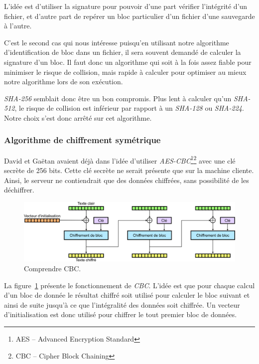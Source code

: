 \documentclass[a4paper,10pt, twoside]{report}
\begin{document}
\begin{spacing}{1.2}
L'idée est d'utiliser la signature pour pouvoir d'une part vérifier
l'intégrité d'un fichier, et d'autre part de repérer un bloc particulier d'un
fichier d'une sauvegarde à l'autre.

C'est le second cas qui nous intéresse puisqu'en utilisant notre
algorithme d'identification de bloc dans un fichier, il sera souvent demandé
de calculer la signature d'un bloc. Il faut donc un algorithme qui soit à la
fois assez fiable pour minimiser le risque de collision, mais rapide à
calculer pour optimiser au mieux notre algorithme lors de son exécution.

\textit{SHA-256}\cite{refSHA256} semblait donc être un bon compromis. Plus
lent à calculer qu'un \textit{SHA-512}, le risque de collision est
inférieur par rapport à un \textit{SHA-128} ou \textit{SHA-224}. Notre
choix s'est donc arrêté sur cet algorithme.

\subsubsection{Algorithme de chiffrement symétrique}

David et Gaëtan avaient déjà dans l'idée d'utiliser
\textit{AES-CBC}\footnote{AES -- Advanced Encryption Standard}\footnote{CBC --
Cipher Block Chaining}\cite{refAES}\cite{refCBC} avec une clé secrète de
256 bits. Cette clé secrète ne serait présente que sur la machine cliente.
Ainsi, le serveur ne contiendrait que des données chiffrées, sans
possibilité de les déchiffrer.

\begin{figure}[h!]
  \centering
  \includegraphics[width=15cm]{softwareDesign/schemaCBC.png}
  \caption{\label{schemaCBC} Comprendre CBC.}
\end{figure}

La figure~\ref{schemaCBC} présente le fonctionnement de \textit{CBC}. L'idée
est que pour chaque calcul d'un bloc de donnée le résultat chiffré soit
utilisé pour calculer le bloc suivant et ainsi de suite jusqu'à ce que
l'intégralité des données soit chiffrée. Un vecteur d'initialisation
est donc utilisé pour chiffrer le tout premier bloc de données.



\end{spacing}
\end{document}
